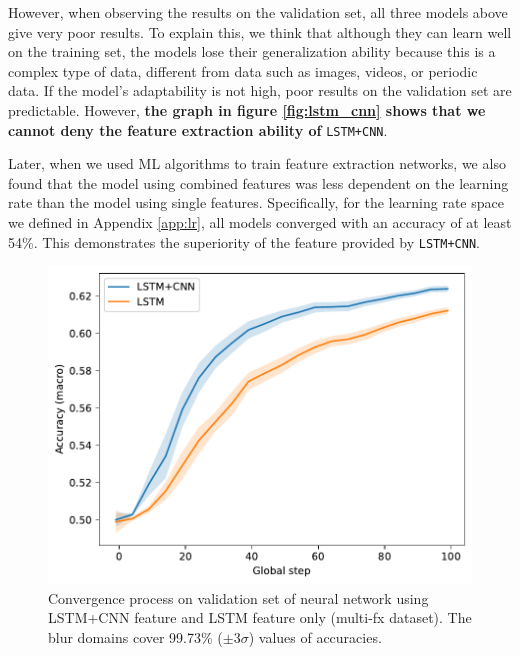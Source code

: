 \documentclass[aps,prb,groupedaddress,twocolumn,showpacs,dvipdfmx,superscriptaddress,pdftex]{revtex4-2}
\begin{document}
However, when observing the results on the validation set, all three models above give very poor results. To explain this, we think that although they can learn well on the training set, the models lose their generalization ability because this is a complex type of data, different from data such as images, videos, or periodic data. If the model's adaptability is not high, poor results on the validation set are predictable. However, \textbf{the graph in figure \ref{fig:lstm_cnn} shows that we cannot deny the feature extraction ability of} \verb|LSTM+CNN|.

\vspace{2mm}


Later, when we used ML algorithms to train feature extraction networks, we also found that the model using combined features was less dependent on the learning rate than the model using single features. Specifically, for the learning rate space we defined in Appendix \ref{app:lr}, all models converged with an accuracy of at least 54\%. This demonstrates the superiority of the feature provided by \verb|LSTM+CNN|.

\begin{figure}
    \centering
    \includegraphics[width=\linewidth]{img/acc.pdf}
    \caption{Convergence process on validation set of neural network using LSTM+CNN feature and LSTM feature only (multi-fx dataset). The blur domains cover 99.73\% ($±3\sigma$) values of accuracies.}
    \label{fig:lstm_cnn_feature}
\end{figure}
\end{document}
